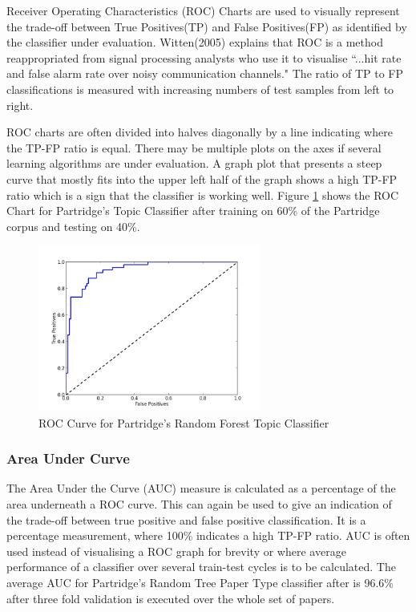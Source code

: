Receiver Operating Characteristics (ROC) Charts are used to visually represent
the trade-off between True Positives(TP) and False Positives(FP) as identified
by the classifier under evaluation. Witten(2005) explains that ROC is a method
reappropriated from signal processing analysts who use it to visualise ``...hit
rate and false alarm rate over noisy communication
channels\cite{witten2005data}." The ratio of TP to FP classifications is
measured with increasing numbers of test samples from left to right. 

ROC charts are often divided into halves diagonally by a line indicating where
the TP-FP ratio is equal. There may be multiple plots on the axes if several
learning algorithms are under evaluation. A graph plot that presents a steep
curve that mostly fits into the upper left half of the graph shows a high TP-FP
ratio which is a sign that the classifier is working well.  Figure
\ref{fig:roc_random_forest} shows the ROC Chart for Partridge's Topic
Classifier after training on 60\% of the Partridge corpus and testing on 40\%.

\begin{figure}[!h]
\begin{center}
\includegraphics[width=0.65\textwidth]{images/testing/ROC.png}
\caption{ ROC Curve for Partridge's Random Forest Topic Classifier}
\label{fig:roc_random_forest}
\end{center}
\end{figure}

\subsubsection{ Area Under Curve }

The Area Under the Curve (AUC) measure is calculated as a percentage of  the
area underneath a ROC curve. This can again be used to give an indication of
the trade-off between true positive and false positive classification. It is a
percentage measurement, where 100\% indicates a high TP-FP ratio. AUC is often
used instead of visualising a ROC graph for brevity or where average
performance of a classifier over several train-test cycles is to be calculated.
The average AUC for Partridge's Random Tree Paper Type classifier after is
96.6\% after three fold validation is executed over the whole set of papers.

